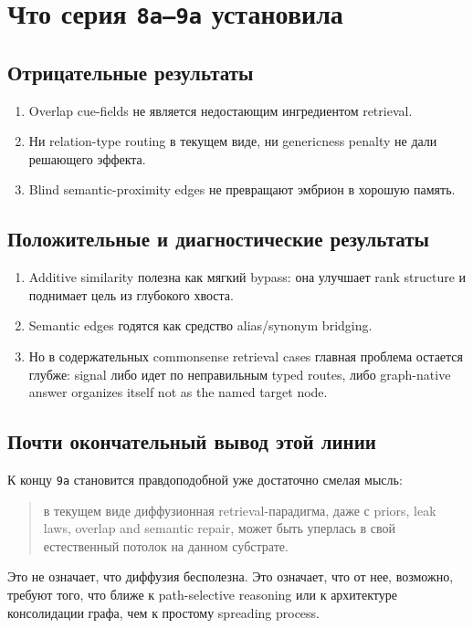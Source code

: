 \section{Что серия \texttt{8a--9a} установила}

\subsection{Отрицательные результаты}

\begin{enumerate}[leftmargin=2em]
\item Overlap cue-fields не является недостающим ингредиентом retrieval.
\item Ни relation-type routing в текущем виде, ни genericness penalty не дали
решающего эффекта.
\item Blind semantic-proximity edges не превращают эмбрион в хорошую память.
\end{enumerate}

\subsection{Положительные и диагностические результаты}

\begin{enumerate}[leftmargin=2em]
\item Additive similarity полезна как мягкий bypass: она улучшает rank structure
и поднимает цель из глубокого хвоста.
\item Semantic edges годятся как средство alias/synonym bridging.
\item Но в содержательных commonsense retrieval cases главная проблема остается
глубже: signal либо идет по неправильным typed routes, либо graph-native answer
organizes itself not as the named target node.
\end{enumerate}

\subsection{Почти окончательный вывод этой линии}

К концу \texttt{9a} становится правдоподобной уже достаточно смелая мысль:

\begin{quote}
в текущем виде диффузионная retrieval-парадигма, даже с priors, leak laws,
overlap and semantic repair, может быть уперлась в свой естественный потолок на
данном субстрате.
\end{quote}

Это не означает, что диффузия бесполезна. Это означает, что от нее, возможно,
требуют того, что ближе к path-selective reasoning или к архитектуре
консолидации графа, чем к простому spreading process.
